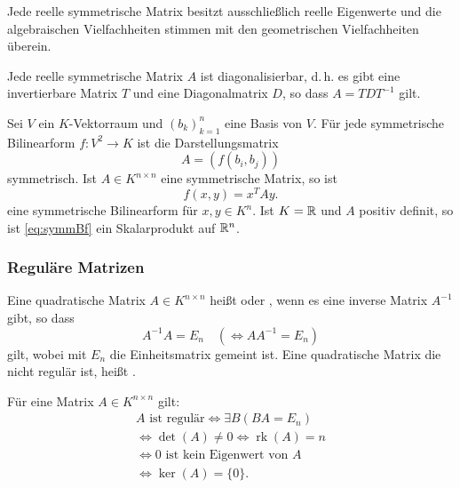 Jede reelle symmetrische Matrix besitzt ausschließlich reelle
Eigenwerte und die algebraischen Vielfachheiten stimmen mit den
geometrischen Vielfachheiten überein.

Jede reelle symmetrische Matrix $A$ ist diagonalisierbar, d.\,h. es gibt
eine invertierbare Matrix $T$ und eine Diagonalmatrix $D$, so dass
$A=TDT^{-1}$ gilt.

Sei $V$ ein $K$-Vektorraum und $(b_k)_{k=1}^n$ eine Basis von $V$.
Für jede symmetrische Bilinearform
$f\colon V^2\to K$ ist die
Darstellungsmatrix
\begin{equation}
A = (f(b_i,b_j))
\end{equation}
symmetrisch. Ist $A\in K^{n\times n}$ eine symmetrische Matrix, so
ist
\begin{equation}\label{eq:symmBf}
f(x,y) = x^T A y.
\end{equation}
eine symmetrische Bilinearform für  $x,y\in K^n$.
Ist $K=\mathbb R$ und $A$ positiv definit, so ist
\eqref{eq:symmBf} ein Skalarprodukt auf $\mathbb R^n$.

\subsubsection{Reguläre Matrizen}
\begin{definition}
Eine quadratische Matrix $A\in K^{n\times n}$ heißt
oder , wenn es eine inverse Matrix $A^{-1}$ gibt,
so dass
\begin{equation}
A^{-1}A = E_n \quad (\iff AA^{-1} = E_n)
\end{equation}
gilt, wobei mit $E_n$ die Einheitsmatrix gemeint ist.
Eine quadratische Matrix die nicht regulär ist, heißt
.
\end{definition}

 Für eine Matrix $A\in K^{n\times n}$ gilt:
\begin{gather}
A\text{ ist regulär}\iff \exists B (BA=E_n)\\
\iff \det(A)\ne 0 \iff \operatorname{rk}(A)=n\\
\iff 0\text{ ist kein Eigenwert von }A\\
\iff \ker(A)=\{0\}.
\end{gather}

